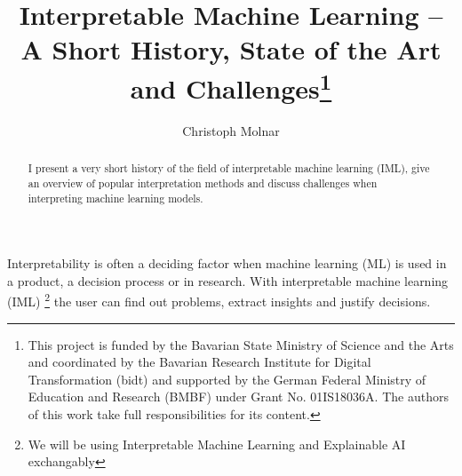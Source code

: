\documentclass[runningheads]{llncs}
\begin{document}
%
\title{Interpretable Machine Learning -- A Short History, State of the Art and Challenges\thanks{This project is funded by the Bavarian State Ministry of Science and the Arts and coordinated by the Bavarian Research Institute for Digital Transformation (bidt) and supported by the German Federal Ministry of Education and Research (BMBF) under Grant No. 01IS18036A.
The authors of this work take full responsibilities for its content.
}}
%
%
\author{Christoph Molnar}
%
%
%
\maketitle              %
%
\begin{abstract}
  I present a very short history of the field of interpretable machine learning (IML), give an overview of popular interpretation methods and discuss challenges when interpreting machine learning models.

\end{abstract}
%
%
Interpretability is often a deciding factor when machine learning (ML) is used in a product, a decision process or in research.
With interpretable machine learning (IML) \footnote{We will be using Interpretable Machine Learning and Explainable AI exchangably} the user can find out problems, extract insights and justify decisions.
\end{document}
